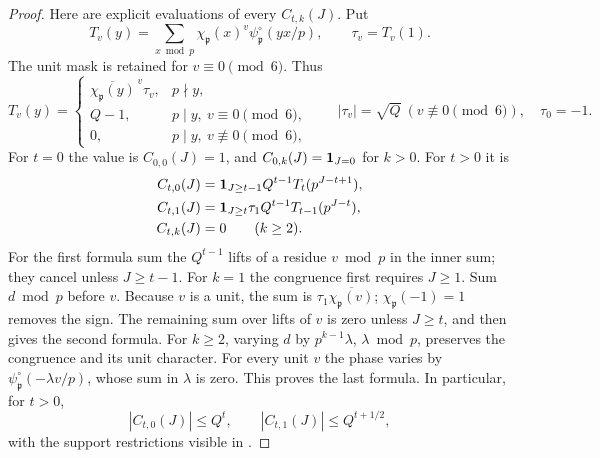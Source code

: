 \begin{proof}
Here are explicit evaluations of every \(C_{t,k}(J)\).  Put
\[
 T_v(y)=\sum_{x\bmod p}\chi_{\mathfrak p}(x)^v
                   \psi_{\mathfrak p}^{\circ}(yx/p),
 \qquad \tau_v=T_v(1).
\]
The unit mask is retained for \(v\equiv0\pmod6\).  Thus
\[
 T_v(y)=
 \begin{cases}
  \overline{\chi_{\mathfrak p}(y)}^{\,v}\tau_v,&p\nmid y,\\
  Q-1,&p\mid y,\ v\equiv0\pmod6,\\
  0,&p\mid y,\ v\not\equiv0\pmod6,
 \end{cases}
 \qquad
 |\tau_v|=\sqrt Q\ (v\not\equiv0\!\!\pmod6),\quad \tau_0=-1.
\]
For \(t=0\) the value is \(C_{0,0}(J)=1\), and
\(C_{0,k}(J)=\mathbf{1}_{J=0}\) for \(k>0\).  For \(t>0\) it is
\begin{equation}
 \begin{split}
 C_{t,0}(J)&=\mathbf{1}_{J\ge t-1}Q^{t-1}T_t(p^{J-t+1}),\\
 C_{t,1}(J)&=\mathbf{1}_{J\ge t}\tau_1Q^{t-1}T_{t-1}(p^{J-t}),\\
 C_{t,k}(J)&=0\qquad(k\ge2).
 \end{split}
\label{eq:C-local-values}
\end{equation}
For the first formula sum the \(Q^{t-1}\) lifts of a residue \(v\bmod p\)
in the inner sum; they cancel unless \(J\ge t-1\).  For \(k=1\) the
congruence first requires \(J\ge1\).  Sum \(d\bmod p\) before \(v\).
Because \(v\) is a unit, the sum is
\(\tau_1\overline{\chi_{\mathfrak p}(v)}\);
\(\chi_{\mathfrak p}(-1)=1\) removes the sign.  The remaining sum over
lifts of \(v\) is zero unless \(J\ge t\), and then gives the second
formula.  For \(k\ge2\), varying \(d\) by \(p^{k-1}\lambda\), \(\lambda\bmod p\),
preserves the congruence and its unit character.  For every unit \(v\)
the phase varies by \(\psi_{\mathfrak p}^{\circ}(-\lambda v/p)\), whose sum in
\(\lambda\) is zero.  This proves the last formula.  In particular, for \(t>0\),
\begin{equation}
 |C_{t,0}(J)|\le Q^t,\qquad
 |C_{t,1}(J)|\le Q^{t+1/2},
\label{eq:C-local-bounds}
\end{equation}
with the support restrictions visible in .


\end{proof}
